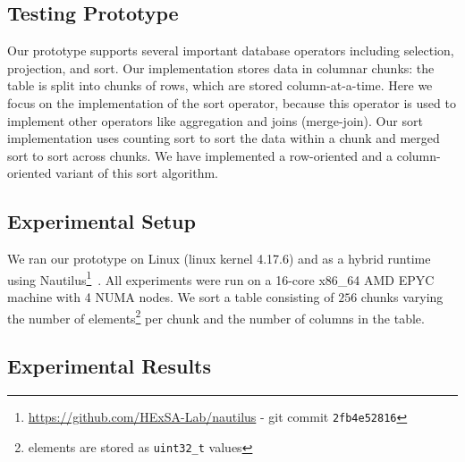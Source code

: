 \documentclass[conference]{IEEEtran}
\begin{document}
\subsection{Testing Prototype}
\label{sec:testing-prototype}

Our prototype supports several important database operators including selection, projection, and sort. Our implementation stores data in columnar chunks: the table is split into chunks of rows, which are stored column-at-a-time. Here we focus on the implementation of the sort operator, because this operator is used to implement other operators like aggregation and joins (merge-join). Our sort implementation uses counting sort to sort the data within a chunk and merged sort to sort across chunks. We have implemented a row-oriented and a column-oriented variant of this sort algorithm.

\subsection{Experimental Setup}
\label{sec:experimental-setup}

We ran our prototype on Linux (linux kernel 4.17.6) and as a hybrid runtime using Nautilus\footnote{\url{https://github.com/HExSA-Lab/nautilus} - git commit \texttt{2fb4e52816}}~\cite{HALE:2015:NAUTILUS,HALE:2016:HRTHVM}.
All experiments were run on a 16-core x86\_64 AMD EPYC machine with 4 NUMA nodes.
We sort a table consisting of $256$ chunks varying the number of elements\footnote{elements are stored as \texttt{uint32\_t} values} per chunk and the number of columns in the table.

\subsection{Experimental Results}
\label{sec:experimental-results}
\end{document}
